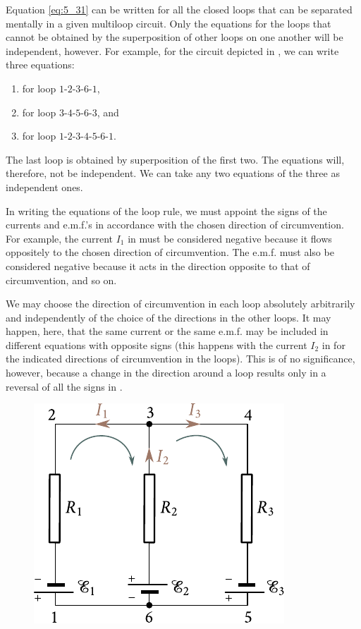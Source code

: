 Equation \eqref{eq:5_31} can be written for all the closed loops that can be separated mentally in a given multiloop circuit. Only the equations for the loops that cannot be obtained by the superposition of
other loops on one another will be independent, however. For example, for the circuit depicted in , we can write three equations:
\begin{enumerate}[(1)]
    \item for loop $1$-$2$-$3$-$6$-$1$,
    \item for loop $3$-$4$-$5$-$6$-$3$, and
    \item for loop $1$-$2$-$3$-$4$-$5$-$6$-$1$.
\end{enumerate}

The last loop is obtained by superposition of the first two. The equations will, therefore, not be independent. We can take any two equations of the three as independent ones.

In writing the equations of the loop rule, we must appoint the signs of the currents and e.m.f.'s in accordance with the chosen direction of circumvention. For example, the current $I_1$ in  must be considered negative because it flows oppositely to the chosen direction of circumvention. The e.m.f. must also be considered negative because it acts in the direction opposite to that of circumvention, and so on.

We may choose the direction of circumvention in each loop absolutely arbitrarily and independently of the choice of the directions in the other loops. It may happen, here, that the same current or the same e.m.f. may be included in different equations with opposite signs (this happens with the current $I_2$ in  for the indicated directions of circumvention in the loops). This is of no significance, however, because a change in the direction around a loop results only in a reversal of all the signs in .

\begin{figure}[t]
	\begin{center}
		\includegraphics[scale=1]{figures/ch_05/fig_5_9.pdf}
		\caption[]{}
		\label{fig:5_9}
	\end{center}
	\vspace{-0.8cm}
\end{figure}

